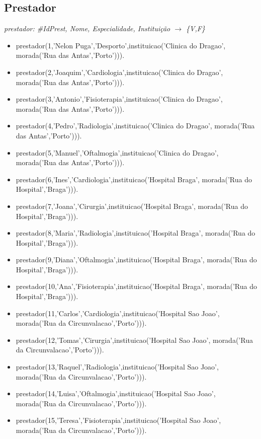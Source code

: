 \documentclass[a4paper]{report} %
\begin{document}
\subsection{Prestador}
\textit{prestador: \#IdPrest, Nome, Especialidade, Instituição $\rightarrow$ \{V,F\}}
\begin{itemize}
\item prestador(1,'Nelon Puga','Desporto',instituicao('Clinica do Dragao', morada('Rua das Antas','Porto'))).
\item prestador(2,'Joaquim','Cardiologia',instituicao('Clinica do Dragao', morada('Rua das Antas','Porto'))).
\item prestador(3,'Antonio','Fisioterapia',instituicao('Clinica do Dragao', morada('Rua das Antas','Porto'))).
\item prestador(4,'Pedro','Radiologia',instituicao('Clinica do Dragao', morada('Rua das Antas','Porto'))).
\item prestador(5,'Manuel','Oftalmogia',instituicao('Clinica do Dragao', morada('Rua das Antas','Porto'))).
\item prestador(6,'Ines','Cardiologia',instituicao('Hospital Braga', morada('Rua do Hospital','Braga'))).
\item prestador(7,'Joana','Cirurgia',instituicao('Hospital Braga', morada('Rua do Hospital','Braga'))).
\item prestador(8,'Maria','Radiologia',instituicao('Hospital Braga', morada('Rua do Hospital','Braga'))).
\item prestador(9,'Diana','Oftalmogia',instituicao('Hospital Braga', morada('Rua do Hospital','Braga'))).
\item prestador(10,'Ana','Fisioterapia',instituicao('Hospital Braga', morada('Rua do Hospital','Braga'))).
\item prestador(11,'Carlos','Cardiologia',instituicao('Hospital Sao Joao', morada('Rua da Circunvalacao','Porto'))).
\item prestador(12,'Tomas','Cirurgia',instituicao('Hospital Sao Joao', morada('Rua da Circunvalacao','Porto'))).
\item prestador(13,'Raquel','Radiologia',instituicao('Hospital Sao Joao', morada('Rua da Circunvalacao','Porto'))).
\item prestador(14,'Luisa','Oftalmogia',instituicao('Hospital Sao Joao', morada('Rua da Circunvalacao','Porto'))).
\item prestador(15,'Teresa','Fisioterapia',instituicao('Hospital Sao Joao', morada('Rua da Circunvalacao','Porto'))).
\end{itemize}
\end{document}
